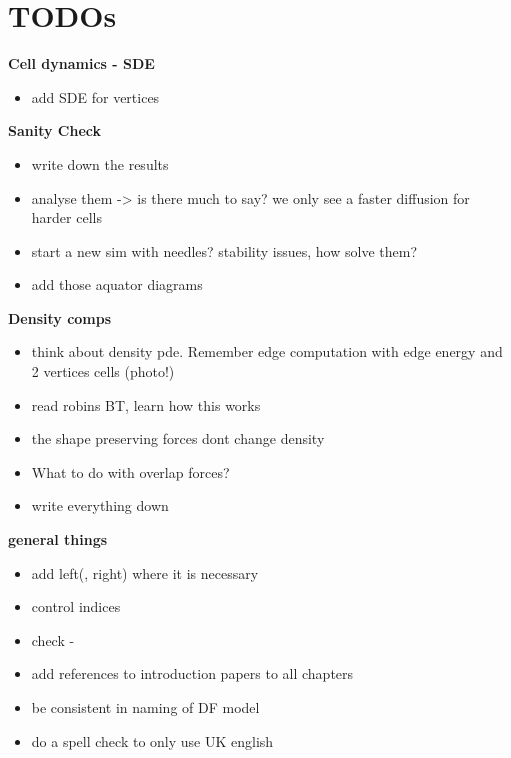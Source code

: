 \section{TODOs}

\textbf{Cell dynamics - SDE}
\begin{itemize}
    \item add SDE for vertices
\end{itemize}


\textbf{Sanity Check}
\begin{itemize}
    \item write down the results 
    \item analyse them -> is there much to say? we only see a faster diffusion for harder cells 
    \item start a new sim with needles? stability issues, how solve them? 
    \item add those aquator diagrams 
\end{itemize}

\textbf{Density comps}
\begin{itemize}
    \item think about density pde. Remember edge computation with edge energy and 2 vertices cells (photo!)
    \item read robins BT, learn how this works 
    \item the shape preserving forces dont change density 
    \item What to do with overlap forces?  
    \item write everything down      
\end{itemize}

\textbf{general things}
\begin{itemize}
    \item add left(, right) where it is necessary 
    \item control indices 
    \item check - 
    \item add references to introduction papers to all chapters
    \item be consistent in naming of DF model 
    \item do a spell check to only use UK english
\end{itemize}